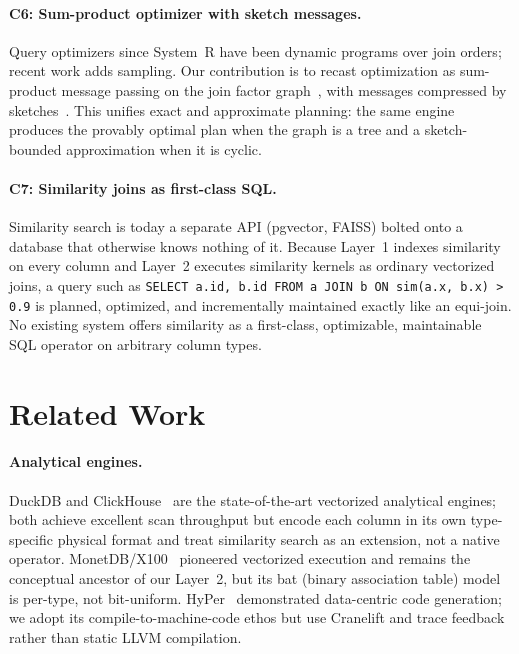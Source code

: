 \documentclass[10pt]{article}
\begin{document}
\paragraph{C6: Sum-product optimizer with sketch messages.}
Query optimizers since System~R have been dynamic programs over join
orders; recent work adds sampling. Our contribution is to recast
optimization as sum-product message passing on the join factor
graph~\citep{kschischang2001factor}, with messages compressed by
sketches~\citep{flajolet2007hyperloglog,cormode2005countmin,fan2014cuckoo}.
This unifies exact and approximate planning: the same engine produces
the provably optimal plan when the graph is a tree and a
sketch-bounded approximation when it is cyclic.

\paragraph{C7: Similarity joins as first-class SQL.}
Similarity search is today a separate API (pgvector, FAISS) bolted onto
a database that otherwise knows nothing of it. Because Layer~1 indexes
similarity on every column and Layer~2 executes similarity kernels as
ordinary vectorized joins, a query such as
\texttt{SELECT a.id, b.id FROM a JOIN b ON sim(a.x, b.x) > 0.9} is
planned, optimized, and incrementally maintained exactly like an
equi-join. No existing system offers similarity as a first-class,
optimizable, maintainable SQL operator on arbitrary column types.

\section{Related Work}
\label{sec:related}

\paragraph{Analytical engines.}
DuckDB and ClickHouse~\citep{schulze2024clickhouse} are the
state-of-the-art vectorized analytical engines; both achieve excellent
scan throughput but encode each column in its own type-specific
physical format and treat similarity search as an extension, not a
native operator. MonetDB/X100~\citep{boncz2005monetdb} pioneered
vectorized execution and remains the conceptual ancestor of our
Layer~2, but its bat (binary association table) model is per-type, not
bit-uniform. HyPer~\citep{neumann2011hyper} demonstrated
data-centric code generation; we adopt its compile-to-machine-code ethos
but use Cranelift and trace feedback rather than static LLVM
compilation.
\end{document}
